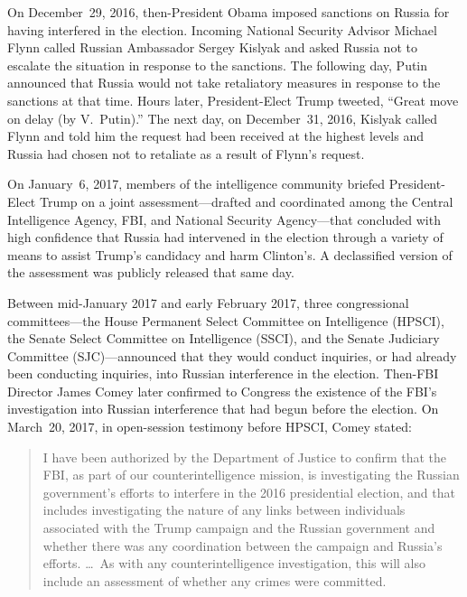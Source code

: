 On December~29, 2016, then-President Obama imposed sanctions on Russia for having interfered in the election.
Incoming National Security Advisor Michael Flynn called Russian Ambassador Sergey Kislyak and asked Russia not to escalate the situation in response to the sanctions.
The following day, Putin announced that Russia would not take retaliatory measures in response to the sanctions at that time.
Hours later, President-Elect Trump tweeted, ``Great move on delay (by V.~Putin).''
The next day, on December~31, 2016, Kislyak called Flynn and told him the request had been received at the highest levels and Russia had chosen not to retaliate as a result of Flynn's request.

\hr

On January~6, 2017, members of the intelligence community briefed President-Elect Trump on a joint assessment---drafted and coordinated among the Central Intelligence Agency, FBI, and National Security Agency---that concluded with high confidence that Russia had intervened in the election through a variety of means to assist Trump's candidacy and harm Clinton's.
A declassified version of the assessment was publicly released that same day.

Between mid-January 2017 and early February 2017, three congressional committees---the House Permanent Select Committee on Intelligence (HPSCI), the Senate Select Committee on Intelligence (SSCI), and the Senate Judiciary Committee (SJC)---announced that they would conduct inquiries, or had already been conducting inquiries, into Russian interference in the election.
Then-FBI Director James Comey later confirmed to Congress the existence of the FBI's investigation into Russian interference that had begun before the election.
On March~20, 2017, in open-session testimony before HPSCI, Comey stated:

\begin{quote}
I have been authorized by the Department of Justice to confirm that the FBI, as part of our counterintelligence mission, is investigating the Russian government's efforts to interfere in the 2016 presidential election, and that includes investigating the nature of any links between individuals associated with the Trump campaign and the Russian government and whether there was any coordination between the campaign and Russia's efforts.
\dots\ 
As with any counterintelligence investigation, this will also include an assessment of whether any crimes were committed.
\end{quote}

